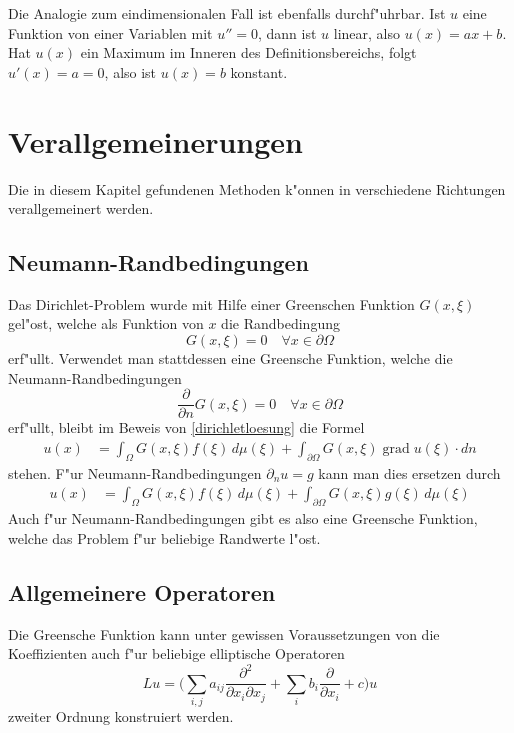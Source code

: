 Die Analogie zum eindimensionalen Fall ist ebenfalls durchf"uhrbar.
Ist $u$ eine Funktion von einer Variablen mit $u''=0$, dann ist
$u$ linear, also $u(x)=ax+b$. Hat $u(x)$ ein Maximum im Inneren
des Definitionsbereichs, folgt $u'(x)=a=0$, also ist $u(x)=b$ konstant.

\section{Verallgemeinerungen}
Die in diesem Kapitel gefundenen Methoden k"onnen in verschiedene Richtungen
verallgemeinert werden.
\subsection{Neumann-Randbedingungen}
Das Dirichlet-Problem wurde mit Hilfe einer Greenschen Funktion $G(x,\xi)$
gel"ost, welche als Funktion von $x$ die Randbedingung
\[
G(x,\xi)=0\quad\forall x\in\partial\Omega
\]
erf"ullt.
Verwendet man stattdessen eine Greensche Funktion, welche die
Neumann-Randbedingungen
\[
\frac{\partial}{\partial n}G(x,\xi)=0\quad\forall x\in\partial\Omega
\]
erf"ullt, bleibt im Beweis von \ref{dirichletloesung}
die Formel
\begin{align*}
u(x)&=\int_{\Omega}G(x,\xi)f(\xi)\,d\mu(\xi)+\int_{\partial\Omega}G(x,\xi)\operatorname{grad}u(\xi)\cdot dn
\end{align*}
stehen. F"ur Neumann-Randbedingungen $\partial_n u=g$ kann man dies ersetzen
durch
\begin{align*}
u(x)&=\int_{\Omega}G(x,\xi)f(\xi)\,d\mu(\xi)+\int_{\partial\Omega}G(x,\xi)g(\xi)\,d\mu(\xi)
\end{align*}
Auch f"ur Neumann-Randbedingungen gibt es also eine Greensche Funktion, welche
das Problem f"ur beliebige Randwerte l"ost.

\subsection{Allgemeinere Operatoren}
Die Greensche Funktion kann unter gewissen Voraussetzungen
von die Koeffizienten auch f"ur beliebige elliptische Operatoren
\[
Lu=\biggl(\sum_{i,j}a_{ij}\frac{\partial^2}{\partial x_i\partial x_j}
+\sum_ib_i\frac{\partial}{\partial x_i} +c\biggr)u
\]
zweiter Ordnung konstruiert werden.

